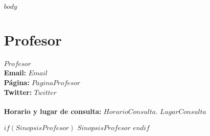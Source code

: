 \documentclass[11pt,fleqn]{report}
\begin{document}

\setcounter{section}{1}

\newpage
$body$


\section{Profesor}

$Profesor$ \vspace{5mm} \\
\textbf{Email:} $Email$ \\
\textbf{Página:} $PaginaProfesor$ \\
\textbf{Twitter:} $Twitter$
\\
\\
\textbf{Horario y lugar de consulta:} $HorarioConsulta$. $LugarConsulta$

$if(SinopsisProfesor)$
$SinopsisProfesor$ %
$endif$
\end{document}
